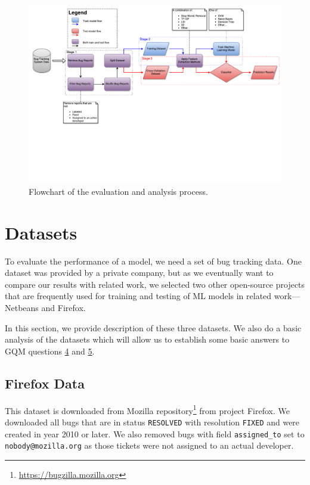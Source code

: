\begin{figure}
    \centering
        \includegraphics[width=530px, trim=0 5cm 0 0, clip]{./images/flowchart/analysis_flowchart.pdf}
    \caption{Flowchart of the evaluation and analysis process.}
    \label{fig:model.flowchart}
\end{figure}
\clearpage

\section{Datasets}
\label{section:datasets}

To evaluate the performance of a model, we need a set of bug tracking data. One dataset was provided by a private company, but as we eventually want to compare our results with related work, we selected two other open-source projects that are frequently used for training and testing of ML models in related work---Netbeans and Firefox.

In this section, we provide description of these three datasets. We also do a basic analysis of the datasets which will allow us to establish some basic answers to GQM questions \hyperlink{question:4}{4} and \hyperlink{question:5}{5}.

\subsection{Firefox Data}

This dataset is downloaded from Mozilla repository\footnote{\url{https://bugzilla.mozilla.org}} from project Firefox. We downloaded all bugs that are in status \texttt{RESOLVED} with resolution \texttt{FIXED} and were created in year 2010 or later. We also removed bugs with field \texttt{assigned\_to} set to \texttt{nobody@mozilla.org} as those tickets were not assigned to an actual developer.

